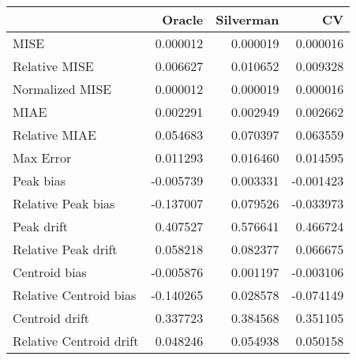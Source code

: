 \begin{tabular}{lrrr}
  \hline
 & Oracle & Silverman & CV \\ 
  \hline
MISE & 0.000012 & 0.000019 & 0.000016 \\ 
  Relative MISE & 0.006627 & 0.010652 & 0.009328 \\ 
  Normalized MISE & 0.000012 & 0.000019 & 0.000016 \\ 
  MIAE & 0.002291 & 0.002949 & 0.002662 \\ 
  Relative MIAE & 0.054683 & 0.070397 & 0.063559 \\ 
  Max Error & 0.011293 & 0.016460 & 0.014595 \\ 
  Peak bias & -0.005739 & 0.003331 & -0.001423 \\ 
  Relative Peak bias & -0.137007 & 0.079526 & -0.033973 \\ 
  Peak drift & 0.407527 & 0.576641 & 0.466724 \\ 
  Relative Peak drift & 0.058218 & 0.082377 & 0.066675 \\ 
  Centroid bias & -0.005876 & 0.001197 & -0.003106 \\ 
  Relative Centroid bias & -0.140265 & 0.028578 & -0.074149 \\ 
  Centroid drift & 0.337723 & 0.384568 & 0.351105 \\ 
  Relative Centroid drift & 0.048246 & 0.054938 & 0.050158 \\ 
   \hline
\end{tabular}
